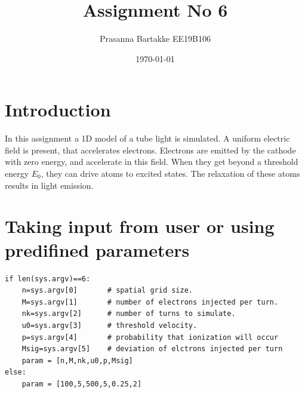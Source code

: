 \documentclass[11pt, a4paper]{article}
\title{Assignment No 6} %
\author{Prasanna Bartakke EE19B106} %
\date{\today} %
\begin{document}
		
		
\maketitle %
\section{Introduction}
In this assignment a 1D model of a tube light is simulated. A uniform electric field is present, that accelerates electrons. Electrons are emitted by the cathode with zero energy, and accelerate in this field. When they get beyond a threshold energy $E_0$, they can drive atoms to excited states. The relaxation of these atoms results in light emission. 
\section{Taking input from user or using predifined parameters}
\begin{verbatim}	
if len(sys.argv)==6:
    n=sys.argv[0]       # spatial grid size.
    M=sys.argv[1]       # number of electrons injected per turn.
    nk=sys.argv[2]      # number of turns to simulate.
    u0=sys.argv[3]      # threshold velocity.
    p=sys.argv[4]       # probability that ionization will occur
    Msig=sys.argv[5]    # deviation of elctrons injected per turn
    param = [n,M,nk,u0,p,Msig]
else:
    param = [100,5,500,5,0.25,2] 
\end{verbatim}
\end{document}
